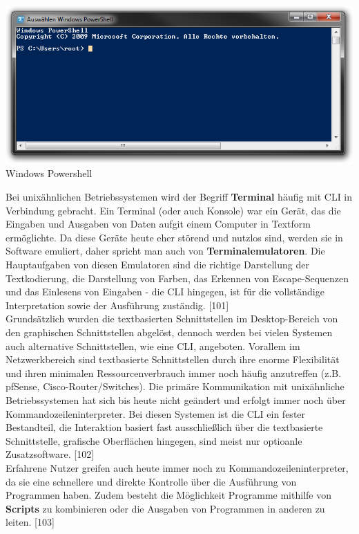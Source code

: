 \documentclass[12pt,a4paper]{report}
\begin{document}
\begin{onehalfspace}
\begin{center}
\includegraphics[scale=0.52]{img/powershell.png}\\
Windows Powershell
\end{center}

Bei unixähnlichen Betriebssystemen wird der Begriff \textbf{Terminal} häufig mit CLI in Verbindung gebracht. Ein Terminal (oder auch Konsole) war ein Gerät, das die Eingaben und Ausgaben von Daten aufgit einem Computer in Textform ermöglichte. Da diese Geräte heute eher störend und nutzlos sind, werden sie in Software emuliert, daher spricht man auch von \textbf{Terminalemulatoren}. Die Hauptaufgaben von diesen Emulatoren sind die richtige Darstellung der Textkodierung, die Darstellung von Farben, das Erkennen von Escape-Sequenzen und das Einlesens von Eingaben - die CLI hingegen, ist für die vollständige Interpretation sowie der Ausführung zuständig. [101]\\

Grundsätzlich wurden die textbasierten Schnittstellen im Desktop-Bereich von den graphischen Schnittstellen abgelöst, dennoch werden bei vielen Systemen auch alternative Schnittstellen, wie eine CLI, angeboten. Vorallem im Netzwerkbereich sind textbasierte Schnittstellen durch ihre enorme Flexibilität und ihren minimalen Ressourcenverbrauch immer noch häufig anzutreffen (z.B. pfSense, Cisco-Router/Switches). Die primäre Kommunikation mit unixähnliche Betriebssystemen hat sich bis heute nicht geändert und erfolgt immer noch über Kommandozeileninterpreter. Bei diesen Systemen ist die CLI ein fester Bestandteil, die Interaktion basiert fast ausschließlich über die textbasierte Schnittstelle, grafische Oberflächen hingegen, sind meist nur optioanle Zusatzsoftware. [102]\\ 

Erfahrene Nutzer greifen auch heute immer noch zu Kommandozeileninterpreter, da sie eine schnellere und direkte Kontrolle über die Ausführung von Programmen haben. Zudem besteht die Möglichkeit Programme mithilfe von \textbf{Scripts} zu kombinieren oder die Ausgaben von Programmen in anderen zu leiten. [103]


\end{onehalfspace}
\end{document}
